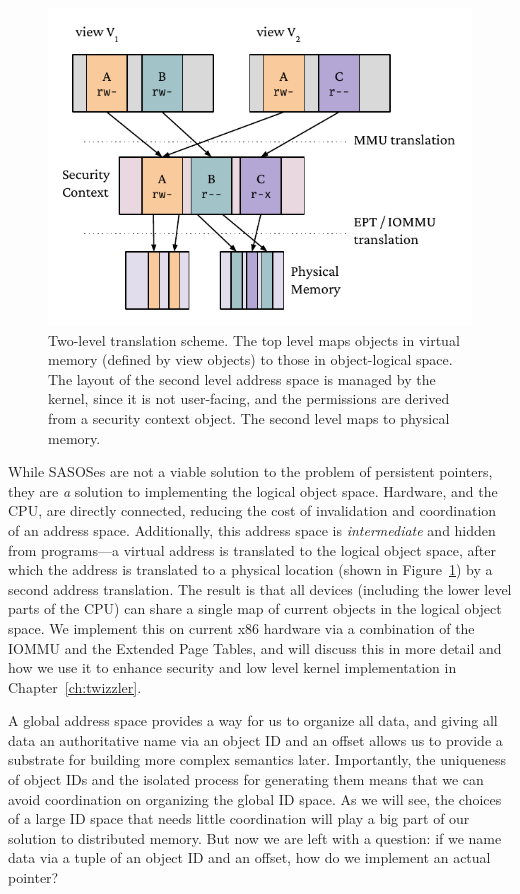 \begin{figure}
    \centering
    \includegraphics[width=\linewidth]{fig/2level}
    \caption{Two-level translation scheme. The top level maps objects in virtual memory (defined by view
        objects) to those in object-logical space. The layout of the second level address space is managed
        by the kernel, since it is not user-facing, and the permissions are derived from a security context
        object. The second level maps to physical memory.}
    \label{fig:twolevel}
\end{figure}


While SASOSes are not a viable solution to the problem of persistent pointers, they are
\emph{a} solution to implementing the logical object space.  Hardware, and the CPU, are
directly connected, reducing the cost of invalidation and coordination of an address space.
Additionally, this address space is \emph{intermediate} and hidden from programs---a virtual
address is translated to the logical object space, after which the address is translated to a
physical location (shown in Figure~\ref{fig:twolevel}) by a second address translation. The result is that all devices
(including the lower level parts of the CPU) can share a single map of current objects in the logical object space. We
implement this on current x86 hardware via a combination of the IOMMU and the Extended Page Tables, and will discuss
this in more detail and how we use it to enhance security and low level kernel implementation in Chapter~\ref{ch:twizzler}.

\begin{chconc}
    A global address space provides a way for us to organize all data, and giving all data an authoritative name via an
    object ID and an offset allows us to provide a substrate for building more complex semantics later. Importantly, the
    uniqueness of object IDs and the isolated process for generating them means that we can avoid coordination on
    organizing the global ID space. As we will see, the choices of a large ID space that needs little coordination will
    play a big part of our solution to distributed memory. But now we are left with a question: if we name data via a
    tuple of an object ID and an offset, how do we implement an actual pointer?
\end{chconc}